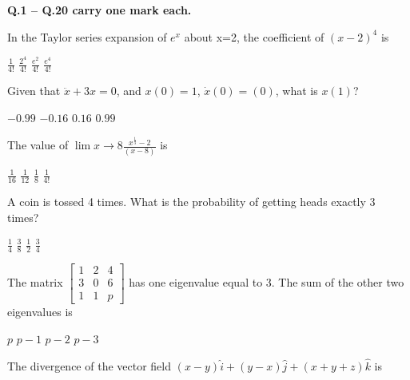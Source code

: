 \documentclass[addpoints,10pt]{exam}
\begin{document}
\large\textbf{Q.1 -- Q.20 carry one mark each.}\\
\begin{questions}

    \question In the Taylor series expansion of $e^x$ about x=2, the coefficient of $(x-2)^4$ is

    \begin{oneparchoices}
        \choice $\frac{1}{4!}$
        \choice $\frac{2^4}{4!}$
        \choice $\frac{e^2}{4!}$
        \choice $\frac{e^4}{4!}$
    \end{oneparchoices}

    \question Given that $\ddot{x} + 3x = 0$, and $x(0)=1$, $\dot{x}(0)=(0)$, what is $x(1)$?

    \begin{oneparchoices}
        \choice $-0.99$
        \choice $-0.16$
        \choice $0.16$
        \choice $0.99$
    \end{oneparchoices}

    \question The value of $\lim{x\rightarrow8} \frac{x^{\frac{1}{3}}-2}{(x-8)}$ is

    \begin{oneparchoices}
        \choice $\frac{1}{16}$
        \choice $\frac{1}{12}$
        \choice $\frac{1}{8}$
        \choice $\frac{1}{4!}$
    \end{oneparchoices}

    \question A coin is tossed 4 times. What is the probability of getting heads exactly 3 times?

    \begin{oneparchoices}
        \choice $\frac{1}{4}$
        \choice $\frac{3}{8}$
        \choice $\frac{1}{2}$
        \choice $\frac{3}{4}$
    \end{oneparchoices}

    \question The matrix $\begin{bmatrix}
            1 & 2 & 4 \\
            3 & 0 & 6 \\
            1 & 1 & p
        \end{bmatrix}$ has one eigenvalue equal to 3. The sum of the other two eigenvalues is

    \begin{oneparchoices}
        \choice $p$
        \choice $p-1$
        \choice $p-2$
        \choice $p-3$
    \end{oneparchoices}

    \question The divergence of the vector field $(x-y)\hat{i} + (y-x)\hat{j} + (x+y+z)\hat{k}$ is


\end{questions}
\end{document}
